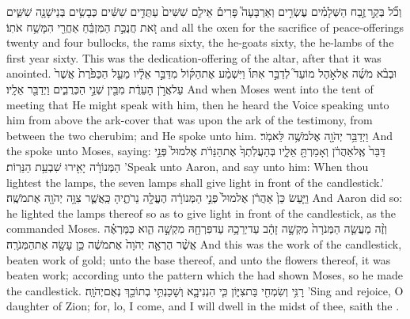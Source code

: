 \documentclass[11pt, openany]{book}
\begin{document}
{וְכֹ֞ל בְּקַ֣ר \legarmeh  זֶ֣בַח הַשְּׁלָמִ֗ים עֶשְׂרִ֣ים וְאַרְבָּעָה֮ פָּרִים֒ אֵילִ֤ם שִׁשִּׁים֙ עַתֻּדִ֣ים שִׁשִּׁ֔ים כְּבָשִׂ֥ים בְּנֵי\maqqaf שָׁנָ֖ה שִׁשִּׁ֑ים זֹ֚את חֲנֻכַּ֣ת הַמִּזְבֵּ֔חַ אַחֲרֵ֖י הִמָּשַׁ֥ח אֹתֽוֹ׃}
{and all the oxen for the sacrifice of peace-offerings twenty and four bullocks, the rams sixty, the he-goats sixty, the he-lambs of the first year sixty. This was the dedication-offering of the altar, after that it was anointed.}
{וּבְבֹ֨א מֹשֶׁ֜ה אֶל\maqqaf אֹ֣הֶל מוֹעֵד֮ לְדַבֵּ֣ר אִתּוֹ֒ וַיִּשְׁמַ֨ע אֶת\maqqaf הַקּ֜וֹל מִדַּבֵּ֣ר אֵלָ֗יו מֵעַ֤ל הַכַּפֹּ֙רֶת֙ אֲשֶׁר֙ עַל\maqqaf אֲרֹ֣ן הָעֵדֻ֔ת מִבֵּ֖ין שְׁנֵ֣י הַכְּרֻבִ֑ים וַיְדַבֵּ֖ר אֵלָֽיו׃ \petucha }
{And when Moses went into the tent of meeting that He might speak with him, then he heard the Voice speaking unto him from above the ark-cover that was upon the ark of the testimony, from between the two cherubim; and He spoke unto him.}
\newperek
{}
{וַיְדַבֵּ֥ר יְהֹוָ֖ה אֶל\maqqaf מֹשֶׁ֥ה לֵּאמֹֽר׃}
{And the \lord\space spoke unto Moses, saying:}
{דַּבֵּר֙ אֶֽל\maqqaf אַהֲרֹ֔ן וְאָמַרְתָּ֖ אֵלָ֑יו בְּהַעֲלֹֽתְךָ֙ אֶת\maqqaf הַנֵּרֹ֔ת אֶל\maqqaf מוּל֙ פְּנֵ֣י הַמְּנוֹרָ֔ה יָאִ֖ירוּ שִׁבְעַ֥ת הַנֵּרֽוֹת׃}
{’Speak unto Aaron, and say unto him: When thou lightest the lamps, the seven lamps shall give light in front of the candlestick.’}
{וַיַּ֤עַשׂ כֵּן֙ אַהֲרֹ֔ן אֶל\maqqaf מוּל֙ פְּנֵ֣י הַמְּנוֹרָ֔ה הֶעֱלָ֖ה נֵרֹתֶ֑יהָ כַּֽאֲשֶׁ֛ר צִוָּ֥ה יְהֹוָ֖ה אֶת\maqqaf מֹשֶֽׁה׃}
{And Aaron did so: he lighted the lamps thereof so as to give light in front of the candlestick, as the \lord\space commanded Moses.}
{וְזֶ֨ה מַעֲשֵׂ֤ה הַמְּנֹרָה֙ מִקְשָׁ֣ה זָהָ֔ב עַד\maqqaf יְרֵכָ֥הּ עַד\maqqaf פִּרְחָ֖הּ מִקְשָׁ֣ה הִ֑וא כַּמַּרְאֶ֗ה אֲשֶׁ֨ר הֶרְאָ֤ה יְהֹוָה֙ אֶת\maqqaf מֹשֶׁ֔ה כֵּ֥ן עָשָׂ֖ה אֶת\maqqaf הַמְּנֹרָֽה׃ \petucha }
{And this was the work of the candlestick, beaten work of gold; unto the base thereof, and unto the flowers thereof, it was beaten work; according unto the pattern which the \lord\space had shown Moses, so he made the candlestick.}
\label{haft_hanukka1}
\setcounter{chap}{2}
\setcounter{verse}{14}
{רָנִּ֥י וְשִׂמְחִ֖י בַּת\maqqaf צִיּ֑וֹן כִּ֧י הִנְנִי\maqqaf בָ֛א וְשָׁכַנְתִּ֥י בְתוֹכֵ֖ךְ נְאֻם\maqqaf יְהֹוָֽה׃}
{’Sing and rejoice, O daughter of Zion; for, lo, I come, and I will dwell in the midst of thee, saith the \lord.}
\end{document}
